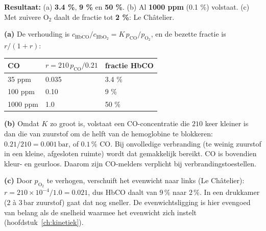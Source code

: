 \begin{oplossing}
\textbf{Resultaat:} (a) \textbf{3.4 \%}, \textbf{9 \%} en \textbf{50 \%}. (b) Al \textbf{1000 ppm} (0.1 \%) volstaat. (c) Met zuivere O\ensuremath{_{2}} daalt de fractie tot \textbf{2 \%}: Le Châtelier.

\textbf{(a)} De verhouding is \(c_{\mathrm{HbCO}}/c_{\mathrm{HbO_2}} = K\,p_{\mathrm{CO}}/p_{\mathrm{O_2}}\), en de bezette fractie is \(r/(1+r)\):

\begin{center}
\begin{tabular}{lll}
\toprule
CO & \(r = 210\,p_{\mathrm{CO}}/0.21\) & fractie HbCO \\
\midrule
35 ppm & 0.035 & 3.4 \% \\
100 ppm & 0.10 & 9 \% \\
1000 ppm & 1.0 & 50 \% \\
\bottomrule
\end{tabular}
\end{center}

\textbf{(b)} Omdat \(K\) zo groot is, volstaat een CO-concentratie die \(210\) keer kleiner is dan die van zuurstof om de helft van de hemoglobine te blokkeren: \(0.21/210 = 0.001\,\mathrm{bar}\), of \(0.1\,\%\) CO. Bij onvolledige verbranding (te weinig zuurstof in een kleine, afgesloten ruimte) wordt dat gemakkelijk bereikt. CO is bovendien kleur- en geurloos. Daarom zijn CO-melders verplicht bij verbrandingstoestellen.

\textbf{(c)} Door \(p_{\mathrm{O_2}}\) te verhogen, verschuift het evenwicht naar links (Le Châtelier): \(r = 210 \times 10^{-4}/1.0 = 0.021\), dus HbCO daalt van \(9\,\%\) naar \(2\,\%\). In een drukkamer (\(2\) à \(3\,\mathrm{bar}\) zuurstof) gaat dat nog sneller. De evenwichtsligging is hier evengoed van belang als de snelheid waarmee het evenwicht zich instelt (hoofdstuk~\ref{ch:kinetiek}).
\end{oplossing}

